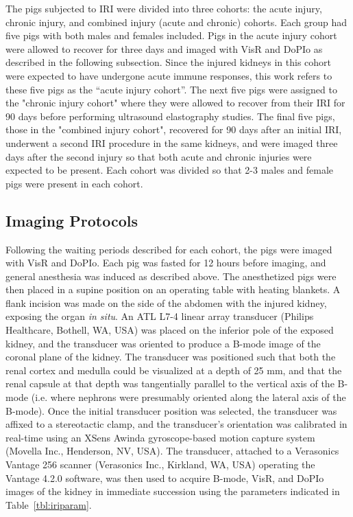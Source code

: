 The pigs subjected to IRI were divided into three cohorts: the acute injury, chronic injury, and combined injury (acute and chronic) cohorts. Each group had five pigs with both males and females included. Pigs in the acute injury cohort were allowed to recover for three days and imaged with VisR and DoPIo as described in the following subsection. Since the injured kidneys in this cohort were expected to have undergone acute immune responses, this work refers to these five pigs as the “acute injury cohort”. The next five pigs were assigned to the "chronic injury cohort" where they were allowed to recover from their IRI for 90 days before performing ultrasound elastography studies. The final five pigs, those in the "combined injury cohort", recovered for 90 days after an initial IRI, underwent a second IRI procedure in the same kidneys, and were imaged three days after the second injury so that both acute and chronic injuries were expected to be present. Each cohort was divided so that 2-3 males and female pigs were present in each cohort.

\subsection{Imaging Protocols}

Following the waiting periods described for each cohort, the pigs were imaged with VisR and DoPIo. Each pig was fasted for 12 hours before imaging, and general anesthesia was induced as described above. The anesthetized pigs were then placed in a supine position on an operating table with heating blankets. A flank incision was made on the side of the abdomen with the injured kidney, exposing the organ \emph{in situ}. An ATL L7-4 linear array transducer (Philips Healthcare, Bothell, WA, USA) was placed on the inferior pole of the exposed kidney, and the transducer was oriented to produce a B-mode image of the coronal plane of the kidney. The transducer was positioned such that both the renal cortex and medulla could be visualized at a depth of 25 mm, and that the renal capsule at that depth was tangentially parallel to the vertical axis of the B-mode (i.e. where nephrons were presumably oriented along the lateral axis of the B-mode). Once the initial transducer position was selected, the transducer was affixed to a stereotactic clamp, and the transducer's orientation was calibrated in real-time using an XSens Awinda gyroscope-based motion capture system (Movella Inc., Henderson, NV, USA). The transducer, attached to a Verasonics Vantage 256 scanner (Verasonics Inc., Kirkland, WA, USA) operating the Vantage 4.2.0 software, was then used to acquire B-mode, VisR, and DoPIo images of the kidney in immediate succession using the parameters indicated in Table~\ref{tbl:iriparam}.

